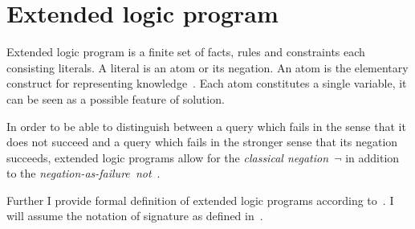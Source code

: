 \section{Extended logic program}

Extended logic program is a finite set of facts, rules and constraints
each consisting literals. A literal is an atom or its negation.
An atom is the elementary construct for representing knowledge~\cite{Delgrande}.
Each atom constitutes a single variable, it can be seen as a possible feature of solution.

In order to be able to distinguish between a query which fails in the sense
that it does not succeed and a query which fails in the stronger sense
that its negation succeeds, extended logic programs allow
for the \textit{classical negation~$\neg$}
in addition to the \textit{negation-as-failure~not}~\cite{gelfond1991}.

Further I provide formal definition of extended logic programs according to~\cite{gelfond1991,KRHandbook}.
I will assume the notation of signature as defined in~\cite{zarba2006}.


